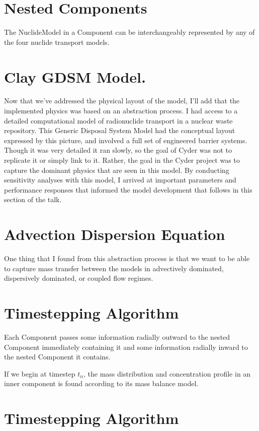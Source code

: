 \documentclass[letterpaper]{article}
\begin{document}
{  \section{Nested Components}
  The NuclideModel in a Component can be interchangeably represented by any of 
  the four nuclide transport models. 

\section{Clay GDSM Model.}

Now that we've addressed the physical layout of the model, I'll add that the 
implemented physics was based on an abstraction process. I had access to a 
detailed computational model of radionuclide transport in a nuclear waste 
repository. This Generic Disposal System Model had the conceptual layout 
expressed by this picture, and involved a full set of engineered barrier 
systems. Though it was very detailed it ran slowly, so the goal of Cyder was 
not to replicate it or simply link to it. Rather, the goal in the Cyder project 
was to capture the dominant physics that are seen in this model. By conducting 
sensitivity analyses with this model, I arrived at important parameters and 
performance responses that informed the model development that follows in this 
section of the talk.

  \section{Advection Dispersion Equation}
  One thing that I found from this abstraction process is that we want to be 
  able to capture mass transfer between the models in advectively dominated, 
  dispersively dominated, or coupled flow regimes.

\section{Timestepping Algorithm}

Each Component passes some information radially outward to the nested 
Component immediately containing it and some information radially 
inward to the nested Component it contains. 

If we begin at timestep $t_n$, the mass distribution and concentration 
profile in an inner component is found according to its mass balance model.

\section{Timestepping Algorithm}

}
\end{document}
